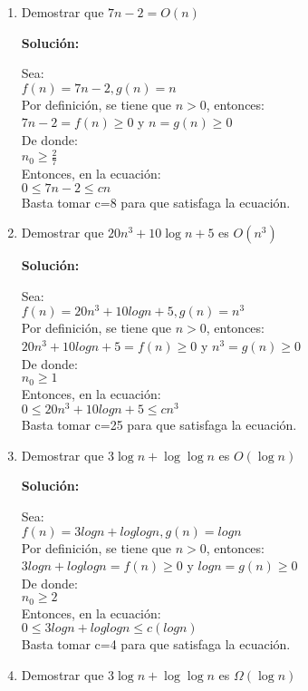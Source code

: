 \documentclass{article}
\begin{document}
\begin{enumerate}[label=\textbf{\alph*.}]
  \item Demostrar que $7n - 2 = O(n)$
  
  \textbf{Solución:}
  
  Sea: \\
  $f(n) = 7n-2,  g(n) = n$\\
  Por definición, se tiene que $n > 0$, entonces:\\
  $7n-2=f(n) \geq 0$ y $n=g(n) \geq 0$\\
  De donde:\\
  $ n_0 \geq \frac{2}{7}$\\
  Entonces, en la ecuación:\\
  $0 \leq 7n-2 \leq cn$\\
  Basta tomar c=8 para que satisfaga la ecuación.
  
  \item Demostrar que $20n^3 + 10 \log n + 5$ es $O(n^3)$
  
  \textbf{Solución:}
  
  Sea: \\
  $f(n) = 20n^3+10logn + 5,  g(n) = n^3$\\
  Por definición, se tiene que $n > 0$, entonces:\\
  $20n^3+10logn + 5=f(n) \geq 0$ y $n^3=g(n) \geq 0$\\
  De donde:\\
  $ n_0 \geq 1$\\
  Entonces, en la ecuación:\\
  $0 \leq 20n^3+10logn + 5 \leq cn^3$\\
  Basta tomar c=25 para que satisfaga la ecuación.
  
  \item Demostrar que $3 \log n + \log \log n$ es $O(\log n)$
  
  \textbf{Solución:}
  
  Sea: \\
  $f(n) = 3logn + loglogn,  g(n) = logn$\\
  Por definición, se tiene que $n > 0$, entonces:\\
  $3logn + loglogn=f(n) \geq 0$ y $logn=g(n) \geq 0$\\
  De donde:\\
  $ n_0 \geq 2$\\
  Entonces, en la ecuación:\\
  $0 \leq 3logn + loglogn \leq c(logn)$\\
  Basta tomar c=4 para que satisfaga la ecuación.
  
  \item Demostrar que $3 \log n + \log \log n$ es $\Omega (\log n)$
  

\end{enumerate}
\end{document}
